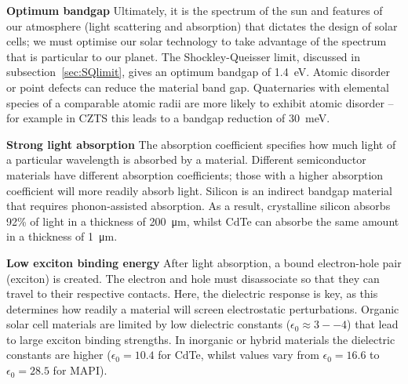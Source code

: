 \newline
\textbf{Optimum bandgap}\newline
Ultimately, it is the spectrum of the sun and features of our atmosphere (light scattering and absorption) that dictates the design of solar cells; we must optimise our solar technology to take advantage of the spectrum that is particular to our planet. The Shockley-Queisser limit, discussed in subsection\ \ref{sec:SQlimit}, gives an optimum bandgap of \SI{1.4}{\electronvolt}.\autocite{Ruhle2016}
Atomic disorder or point defects can reduce the material band gap. Quaternaries with elemental species of a comparable atomic radii are more likely to exhibit atomic disorder -- for example in CZTS this leads to a bandgap reduction of \SI{30}{meV}.\autocite{Rey2018}

\newline
\textbf{Strong light absorption}\newline
The absorption coefficient specifies how much light of a particular wavelength is absorbed by a material. Different semiconductor materials have different absorption coefficients; those with a higher absorption coefficient will more readily absorb light. Silicon is an indirect bandgap material that requires phonon-assisted absorption. As a result, crystalline silicon absorbs 92\% of light in a thickness of  \SI{200}{\micro\metre}, whilst CdTe can absorbe the same amount in a thickness of \SI{1}{\micro\metre}.\autocite{Poortmans2006}

\newline
\textbf{Low exciton binding energy}\newline
After light absorption, a bound electron-hole pair (exciton) is created. The electron and hole must disassociate so that they can travel to their respective contacts. Here, the dielectric response is key, as this determines how readily a material will screen electrostatic perturbations. Organic solar cell materials are limited by low dielectric constants ($\epsilon_0 \approx 3--4$) that lead to large exciton binding strengths.\autocite{Brebels2017} In inorganic or hybrid materials the dielectric constants are higher ($\epsilon_0=10.4$ for CdTe,\autocite{Madelung2004} whilst values vary from $\epsilon_0=16.6$ to $\epsilon_0=28.5$ for MAPI\autocite{Wilson2019}).

